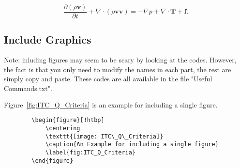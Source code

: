 \begin{equation}\label{eq:N-S_equation}
    \frac{\partial (\rho\mathbf{v})}{\partial t} + \nabla \cdot (\rho \mathbf{v} \mathbf{v}) = -\nabla p + \nabla \cdot\mathbf{T} + \mathbf{f}. 
\end{equation}    

\subsection{Include Graphics} %
Note: inluding figures may seem to be scary by looking at the codes. However, the fact is that you only need to modify the names in each part, the rest are simply copy and paste. These codes are all available in the file "Useful Commands.txt".

Figure~\ref{fig:ITC_Q_Criteria} is an example for including a single figure.
\begin{center}
    \small
    \begin{verbatim}
        \begin{figure}[!htbp]
            \centering
            \texttt{[image: ITC\_Q\_Criteria]}
            \caption{An Example for including a single figure}
            \label{fig:ITC_Q_Criteria}
        \end{figure}
    \end{verbatim}
\end{center}

